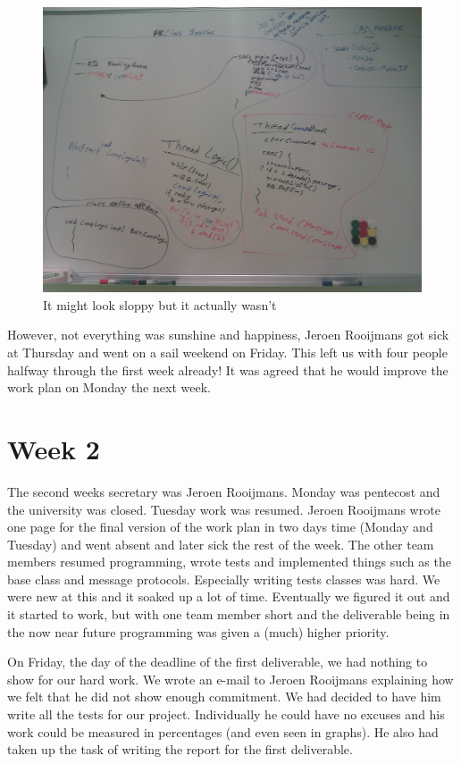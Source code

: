 \documentclass[a4paper,10pt]{article}
\begin{document}
\begin{figure}[h]
\centering
\includegraphics[width=12cm]{whiteboard}
\caption{It might look sloppy but it actually wasn't}
\label{fig:whiteboard}
\end{figure}

However, not everything was sunshine and happiness, Jeroen Rooijmans got sick at Thursday and went on a sail 
weekend on Friday. This left us with four people halfway through the first week already! It 
was agreed that he would improve the work plan on Monday the next week. 

\section{Week 2}
The second weeks secretary was Jeroen Rooijmans. Monday was pentecost and the university was closed. 
Tuesday work was resumed. Jeroen Rooijmans wrote one page for the final version of the work plan in two days time 
(Monday and Tuesday) and went absent and later sick the rest of the week. The other team members resumed
programming, wrote tests and implemented things such as the base class and message protocols. Especially writing tests 
classes was hard.
We were new at this and it soaked up a lot of time. Eventually we figured it out and
it started to work, but with one
team member short and the deliverable being in the now near future programming was given a (much) higher
priority. 

On Friday, the day of the deadline of the first deliverable, we had nothing to show for our hard work. We wrote
an e-mail to Jeroen Rooijmans explaining how we felt that he did not show enough commitment. We had decided to 
have him write all the tests for our project. Individually he could have no excuses and his work could be measured
in percentages (and even seen in graphs). He also had taken up the task of writing the report for the first deliverable. 
\end{document}
